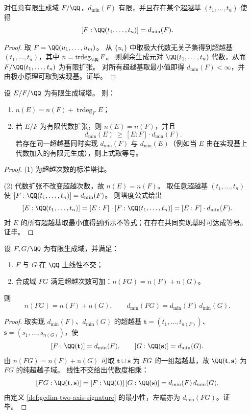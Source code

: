 \begin{proposition}[两轴签名的有限性与实现]\label{prop:gcdim-two-axis-finiteness}
对任意有限生成域 \(F/\QQ\)，\(d_{\min}(F)\) 有限，并且存在某个超越基 \((t_1,\dots,t_n)\) 使得
\[
[F:\QQ(t_1,\dots,t_n)]=d_{\min}(F).
\]
\end{proposition}
\begin{proof}
取 \(F=\QQ(u_1,\dots,u_m)\)。
从 \(\{u_i\}\) 中取极大代数无关子集得到超越基 \((t_1,\dots,t_n)\)，其中 \(n=\operatorname{trdeg}_{\QQ}F\)。
则剩余生成元对 \(\QQ(t_1,\dots,t_n)\) 代数，从而 \(F/\QQ(t_1,\dots,t_n)\) 为有限扩张。
对所有超越基取最小值即得 \(d_{\min}(F)<\infty\)，并由极小原理可取到实现基。证毕。
\end{proof}

\begin{theorem}[塔律与代数度合成下界]\label{thm:gcdim-two-axis-tower-laws}
设 \(E/F/\QQ\) 为有限生成域塔。
则：
\begin{enumerate}
  \item \(n(E)=n(F)+\operatorname{trdeg}_{F}E\)；
  \item 若 \(E/F\) 为有限代数扩张，则 \(n(E)=n(F)\)，并且
  \[
  d_{\min}(E)\ \ge\ [E:F]\cdot d_{\min}(F).
  \]
  若存在同一超越基同时实现 \(d_{\min}(F)\) 与 \(d_{\min}(E)\)（例如当 \(E\) 由在实现基上代数加入的有限元生成），则上式取等号。
\end{enumerate}
\end{theorem}
\begin{proof}
(1) 为超越次数的标准塔律。
\par
(2) 代数扩张不改变超越次数，故 \(n(E)=n(F)\)。
取任意超越基 \((t_1,\dots,t_n)\) 使 \([F:\QQ(t_1,\dots,t_n)]=d_{\min}(F)\)。
则塔度公式给出
\[
[E:\QQ(t_1,\dots,t_n)]=[E:F]\cdot[F:\QQ(t_1,\dots,t_n)]
=[E:F]\cdot d_{\min}(F).
\]
对 \(E\) 的所有超越基取最小值得到所示不等式；在存在共同实现基时可达成等号。证毕。
\end{proof}

\begin{theorem}[线性不交与代数独立条件下的乘法律]\label{thm:gcdim-two-axis-product-laws}
设 \(F,G/\QQ\) 为有限生成域，并满足：
\begin{enumerate}
  \item \(F\) 与 \(G\) 在 \(\QQ\) 上线性不交；
  \item 合成域 \(FG\) 满足超越次数可加：\(n(FG)=n(F)+n(G)\)。
\end{enumerate}
则
\[
n(FG)=n(F)+n(G),
\qquad
d_{\min}(FG)=d_{\min}(F)\,d_{\min}(G).
\]
\end{theorem}
\begin{proof}
取实现 \(d_{\min}(F)\)、\(d_{\min}(G)\) 的超越基 \(\mathbf t=(t_1,\dots,t_{n(F)})\)、\(\mathbf s=(s_1,\dots,s_{n(G)})\)，使
\[
[F:\QQ(\mathbf t)]=d_{\min}(F),
\qquad
[G:\QQ(\mathbf s)]=d_{\min}(G).
\]
由 \(n(FG)=n(F)+n(G)\) 可取 \(\mathbf t\cup \mathbf s\) 为 \(FG\) 的一组超越基，故 \(\QQ(\mathbf t,\mathbf s)\) 为 \(FG\) 的纯超越子域。
线性不交给出代数度相乘：
\[
[FG:\QQ(\mathbf t,\mathbf s)]
=[F:\QQ(\mathbf t)]\,[G:\QQ(\mathbf s)]
=d_{\min}(F)\,d_{\min}(G).
\]
由定义 \ref{def:gcdim-two-axis-signature} 的最小性，左端亦为 \(d_{\min}(FG)\)。证毕。
\end{proof}

